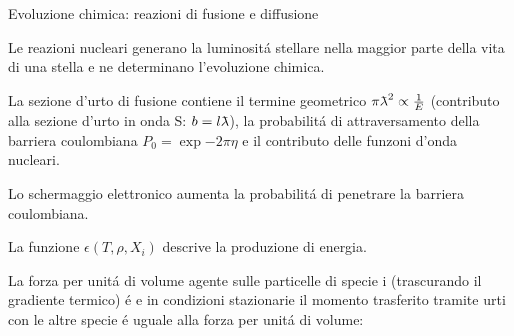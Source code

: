 \documentclass[10pt,xcolor={usenames},fleqn,mathserif,serif]{beamer}
\begin{document}
\begin{comment}
\begin{columns}
\begin{column}{0.5\textwidth}
\end{column}
\begin{column}{0.5\textwidth}
\end{column}
\end{columns}
\end{comment}

\begin{wordonframe}{Evoluzione chimica: reazioni di fusione e diffusione}

Le reazioni nucleari generano la luminosit\'a stellare nella maggior parte della vita di una stella e ne determinano l'evoluzione chimica.

La sezione d'urto di fusione contiene il termine geometrico $\pi\lambdabar^2\propto\frac{1}{E}$ (contributo alla sezione d'urto in onda S: $b=l\lambdabar$),  la probabilit\'a di attraversamento della barriera coulombiana $P_0=\exp{-2\pi\eta}$ e il contributo delle funzoni d'onda nucleari.

Lo schermaggio elettronico aumenta la probabilit\'a di penetrare la barriera coulombiana.

La funzione $\epsilon(T,\rho,X_i)$ descrive la produzione di energia.

La forza per unit\'a di volume agente sulle particelle di specie i (trascurando il gradiente termico) \'e
e in condizioni stazionarie il momento trasferito tramite urti con le altre specie \'e uguale alla forza per unit\'a di volume:

\end{wordonframe}
\end{document}

